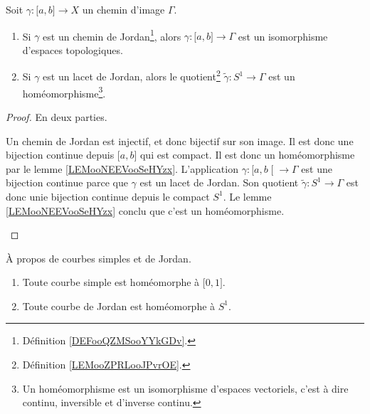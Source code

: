 \begin{lemma}     \label{LEMooCGVOooVPlSRD}
    Soit \( \gamma\colon \mathopen[ a , b \mathclose]\to X\) un chemin d'image \( \Gamma\).
    \begin{enumerate}
        \item       \label{ITEMooWKVAooCQDvpL}
            Si \( \gamma\) est un chemin de Jordan\footnote{Définition \ref{DEFooQZMSooYYkGDv}.}, alors \( \gamma\colon \mathopen[ a , b \mathclose]\to \Gamma\) est un isomorphisme d'espaces topologiques.
        \item       \label{ITEMooVYMXooEtgPJT}
            Si \( \gamma\) est un lacet de Jordan, alors le quotient\footnote{Définition \ref{LEMooZPRLooJPvrOE}.} \( \tilde \gamma\colon S^1\to \Gamma\) est un homéomorphisme\footnote{Un homéomorphisme est un isomorphisme d'espaces vectoriels, c'est à dire continu, inversible et d'inverse continu.}.
    \end{enumerate}
\end{lemma}

\begin{proof}
    En deux parties.
    \begin{subproof}
        Un chemin de Jordan est injectif, et donc bijectif sur son image. Il est donc une bijection continue depuis \( \mathopen[ a , b \mathclose]\) qui est compact. Il est donc un homéomorphisme par le lemme \ref{LEMooNEEVooSeHYzx}.
        L'application \( \gamma\colon \mathopen[ a , b \mathclose[\to \Gamma \) est une bijection continue parce que \( \gamma\) est un lacet de Jordan. Son quotient \( \tilde \gamma\colon S^1\to \Gamma\) est donc unie bijection continue depuis le compact \( S^1\). Le lemme \ref{LEMooNEEVooSeHYzx} conclu que c'est un homéomorphisme.
    \end{subproof}
\end{proof}

\begin{corollary}
    À propos de courbes simples et de Jordan.
    \begin{enumerate}
        \item
            Toute courbe simple est homéomorphe à \( \mathopen[ 0 , 1 \mathclose]\).
        \item
            Toute courbe de Jordan est homéomorphe à \( S^1\).
    \end{enumerate}
\end{corollary}

